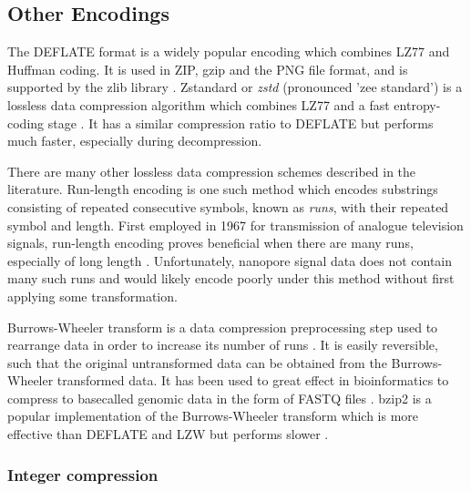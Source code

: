 \subsection{Other Encodings}
\label{sec:data-other}

The DEFLATE format is a widely popular encoding which combines LZ77 and Huffman
coding. It is used in ZIP, gzip and the PNG file format, and is supported by the
zlib library \cite{zip,gzip,png}. Zstandard or \textit{zstd} (pronounced 'zee
standard') is a lossless data compression algorithm which combines LZ77 and a
fast entropy-coding stage \cite{zstd}. It has a similar compression ratio to
DEFLATE but performs much faster, especially during decompression.

There are many other lossless data compression schemes described in the
literature. Run-length encoding is one such method which encodes substrings
consisting of repeated consecutive symbols, known as \textit{runs}, with their
repeated symbol and length. First employed in 1967 for transmission of analogue
television signals, run-length encoding proves beneficial when there are many
runs, especially of long length \cite{rle}. Unfortunately, nanopore signal data
does not contain many such runs and would likely encode poorly under this method
without first applying some transformation.

Burrows-Wheeler transform is a data compression preprocessing step used to
rearrange data in order to increase its number of runs \cite{bwt}. It is easily
reversible, such that the original untransformed data can be obtained from the
Burrows-Wheeler transformed data. It has been used to great effect in
bioinformatics to compress to basecalled genomic data in the form of FASTQ files
\cite{bwt-genomic}. bzip2 is a popular implementation of the Burrows-Wheeler
transform which is more effective than DEFLATE and LZW but performs slower
\cite{bzip2}.

\subsubsection{Integer compression}
\label{sec:integer-comp}

